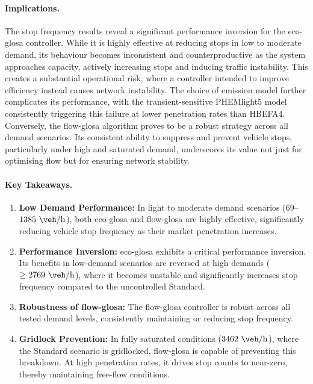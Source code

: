\paragraph{Implications.}
The stop frequency results reveal a significant performance inversion for the \ac{eco-glosa} controller. While it is highly effective at reducing stops in low to moderate demand, its behaviour becomes inconsistent and counterproductive as the system approaches capacity, actively increasing stops and inducing traffic instability. This creates a substantial operational risk, where a controller intended to improve efficiency instead causes network instability. The choice of emission model further complicates its performance, with the transient-sensitive PHEMlight5 model consistently triggering this failure at lower penetration rates than HBEFA4. Conversely, the \ac{flow-glosa} algorithm proves to be a robust strategy across all demand scenarios. Its consistent ability to suppress and prevent vehicle stops, particularly under high and saturated demand, underscores its value not just for optimising flow but for ensuring network stability.

\paragraph{Key Takeaways.}
\begin{enumerate}
    \item \textbf{Low Demand Performance:} In light to moderate demand scenarios ($69$--$1385~\unit{\veh\per\hour}$), both \ac{eco-glosa} and \ac{flow-glosa} are highly effective, significantly reducing vehicle stop frequency as their market penetration increases.
    \item \textbf{Performance Inversion:} \ac{eco-glosa} exhibits a critical performance inversion. Its benefits in low-demand scenarios are reversed at high demands ($ \geq 2769~\unit{\veh\per\hour}$), where it becomes unstable and significantly increases stop frequency compared to the uncontrolled Standard.
    \item \textbf{Robustness of \ac{flow-glosa}:} The \ac{flow-glosa} controller is robust across all tested demand levels, consistently maintaining or reducing stop frequency.
    \item \textbf{Gridlock Prevention:} In fully saturated conditions ($3462~\unit{\veh\per\hour}$), where the Standard scenario is gridlocked, \ac{flow-glosa} is capable of preventing this breakdown. At high penetration rates, it drives stop counts to near-zero, thereby maintaining free-flow conditions.
\end{enumerate}

